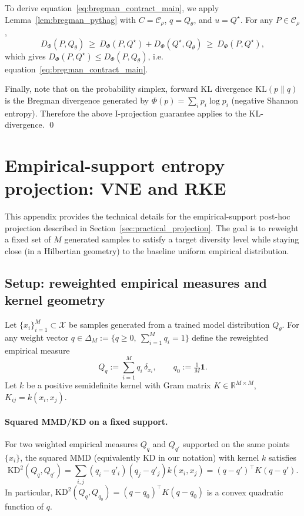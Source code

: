 \documentclass{article}
\theoremstyle{plain}
\theoremstyle{definition}
\def\eqref#1{equation~\ref{#1}}
\begin{document}
\begin{appendices}
To derive \eqref{eq:bregman_contract_main},
we apply Lemma~\ref{lem:bregman_pythag} with $C=\mathcal{C}_\rho$, $q=Q_\theta$, and $u=Q^\star$.
For any $P\in\mathcal{C}_\rho$,
\[
D_\Phi(P,Q_\theta)\ \ge\ D_\Phi(P,Q^\star)+D_\Phi(Q^\star,Q_\theta)\ \ge\ D_\Phi(P,Q^\star),
\]
which gives $D_\Phi(P,Q^\star)\le D_\Phi(P,Q_\theta)$, i.e. \eqref{eq:bregman_contract_main}.

Finally, note that on the probability simplex, forward KL divergence $\mathrm{KL}(p\|q)$ is the Bregman divergence generated by
$\Phi(p)=\sum_i p_i\log p_i$ (negative Shannon entropy).
Therefore the above I-projection guarantee applies to the KL-divergence.
\qed



\section{Empirical-support entropy projection: VNE and RKE}
\label{app:empirical_support_projection}

This appendix provides the technical details for the empirical-support post-hoc projection described in Section~\ref{sec:practical_projection}. The goal is to reweight a fixed set of $M$ generated samples to satisfy a target diversity level while staying close (in a Hilbertian geometry) to the baseline uniform empirical distribution.

\subsection{Setup: reweighted empirical measures and kernel geometry}
Let $\{x_i\}_{i=1}^M\subset\mathcal{X}$ be samples generated from a trained model distribution $Q_\theta$. For any weight vector $q\in\Delta_M:=\{q\ge 0,\ \sum_{i=1}^M q_i=1\}$ define the reweighted empirical measure
\[
Q_q := \sum_{i=1}^M q_i\,\delta_{x_i},
\qquad
q_0:=\tfrac{1}{M}\mathbf{1}.
\]
Let $k$ be a positive semidefinite kernel with Gram matrix $K\in\mathbb{R}^{M\times M}$, $K_{ij}=k(x_i,x_j)$.

\paragraph{Squared MMD/KD on a fixed support.}
For two weighted empirical measures $Q_q$ and $Q_{q'}$ supported on the same points $\{x_i\}$, the squared MMD (equivalently KD in our notation) with kernel $k$ satisfies
\begin{equation}\label{eq:app_kd_quad}
\mathrm{KD}^2(Q_q,Q_{q'})=\sum_{i,j}(q_i-q'_i)(q_j-q'_j)k(x_i,x_j)=(q-q')^\top K (q-q').
\end{equation}
In particular, $\mathrm{KD}^2(Q_q,Q_{q_0})=(q-q_0)^\top K(q-q_0)$ is a convex quadratic function of $q$.


\end{appendices}
\end{document}
